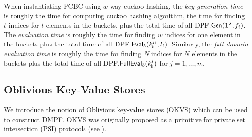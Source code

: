 When instantiating PCBC using $w$-way cuckoo hashing, the \emph{key generation time} is roughly the time for computing cuckoo hashing algorithm, the time for finding $t$ indices for $t$ elements in the buckets, plus the total time of all DPF$.{\sf Gen}(1^\lambda, f_i)$. The \emph{evaluation time} is roughly the time for finding $w$ indices for one element in the buckets plus the total time of all DPF$.{\sf Eval}_b(k_b^{j_i},l_i)$. Similarly, the \emph{full-domain evaluation time} is roughly the time for finding $N$ indices for $N$ elements in the buckets plus the total time of all DPF$.{\sf FullEval}_b(k_b^{j})$ for $j=1,\dots,m$. 

\subsection{Oblivious Key-Value Stores}\label{sec:prelim_okvs}
We introduce the notion of Oblivious key-value stores (OKVS) which can be used to construct DMPF. OKVS was originally proposed as a primitive for private set intersection (PSI) protocols (see \cite{cryptoeprint:2021/883,cryptoeprint:2022/320}). 
